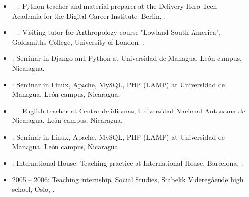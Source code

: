 \begin{itemize}

\item {} – : Python teacher and material preparer at the Delivery Hero Tech Academia for the Digital Career Institute, Berlin, \Germany.

\item {} – : Visiting tutor for Anthropology course "Lowland South America", Goldsmiths College, University of London, \UK.

\item {}: Seminar in Django and Python at Universidad de Managua, León campus, Nicaragua.

\item {}: Seminar in Linux, Apache, MySQL, PHP (LAMP) at Universidad de Managua, León campus, Nicaragua.

\item {} – : English teacher at Centro de idiomas, Universidad Nacional Autonoma de Nicaragua, León campus, Nicaragua.

\item {}: Seminar in Linux, Apache, MySQL, PHP (LAMP) at Universidad de Managua, León campus, Nicaragua.

\item {}: International House. Teaching practice at International House, Barcelona, \Spain.

\item 2005 – 2006: Teaching internship. \english \und Social Studies, Stabekk Videregående high school, Oslo, \Norway.

\end{itemize}
